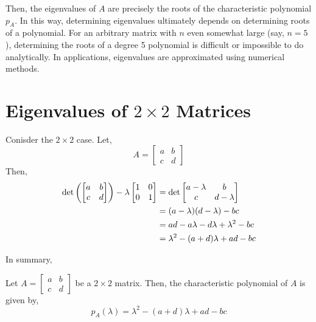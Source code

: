 \documentclass[letterpaper,12pt]{article}
\begin{document}
Then, the eigenvalues of $A$ are precisely the roots of the characteristic polynomial $p_A$. In this way, determining eigenvalues ultimately depends on determining roots of a polynomial. For an arbitrary matrix with $n$ even somewhat large (say, $n = 5$), determining the roots of a degree 5 polynomial is difficult or impossible to do analytically. In applications, eigenvalues are approximated using numerical methods.

\section*{Eigenvalues of $2 \times 2$ Matrices}

Conisder the $2 \times 2$ case. Let,
\begin{equation*}
    A = \begin{bmatrix} a & b \\ c & d \end{bmatrix}
\end{equation*}
Then,
\begin{align*}
    \det{\left( \begin{bmatrix} a & b \\ c & d \end{bmatrix} \right) - \lambda \begin{bmatrix} 1 & 0 \\ 0 & 1 \end{bmatrix}} & = \det{\begin{bmatrix} a - \lambda & b \\ c & d - \lambda \end{bmatrix}} \\
    & = (a - \lambda)(d - \lambda) - bc \\
    & = ad - a\lambda - d\lambda + \lambda^2 - bc \\
    & = \lambda^2 - (a + d) \lambda + ad - bc
\end{align*}

In summary,

\begin{theorem}
Let $A = \begin{bmatrix} a & b \\ c & d \end{bmatrix}$ be a $2 \times 2$ matrix. Then, the characteristic polynomial of $A$ is given by,
\begin{equation*}
    \boxed{p_A(\lambda) = \lambda^2 - (a + d) \lambda + ad - bc}
\end{equation*}
\end{theorem}
\end{document}

